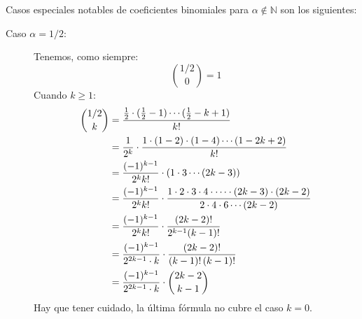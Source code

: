   Casos especiales notables de coeficientes binomiales
  para \(\alpha \notin \mathbb{N}\) son los siguientes:
  \begin{description}
  \item[\boldmath Caso \(\alpha = 1 / 2\):\unboldmath]
    Tenemos,
    como siempre:
    \begin{equation}
      \label{eq:binomial(1/2,0)}
      \binom{1/2}{0}
	= 1
    \end{equation}
    Cuando \(k \ge 1\):
    \begin{align}
      \binom{1/2}{k}
	 &= \frac{\frac{1}{2} \cdot (\frac{1}{2}-1)
	       \dotsm (\frac{1}{2} - k + 1)}{k!} \notag \\
	 &= \frac{1}{2^k}
	       \cdot \frac{1 \cdot (1 - 2) \cdot (1 - 4)
			     \dotsm (1 - 2 k + 2)}{k!} \notag \\
	 &= \frac{(-1)^{k - 1}}{2^k k!}
	       \cdot (1 \cdot 3 \dotsm (2 k - 3)) \notag \\
	 &= \frac{(-1)^{k - 1}}{2^k k!}
	       \cdot \frac{1 \cdot 2 \cdot 3 \cdot 4
			      \cdot \dotsm
			      \cdot (2 k - 3) \cdot (2 k - 2)}
			  {2 \cdot 4 \cdot 6 \dotsm (2 k - 2)}
				\notag \\
	 &= \frac{(-1)^{k - 1}}{2^k k!}
	       \cdot \frac{(2 k - 2)!}{2^{k - 1} (k - 1)!}
		  \notag \\
	 &= \frac{(-1)^{k - 1}}{2^{2 k - 1} \cdot k}
	       \cdot \frac{(2 k - 2)!}{(k - 1)! \, (k - 1)!}
		  \notag \\
	 &= \frac{(-1)^{k - 1}}{2^{2 k - 1} \cdot k}
	       \cdot \binom{2 k - 2}{k - 1}
	    \label{eq:binomial(1/2,k)}
    \end{align}
    Hay que tener cuidado,
    la última fórmula no cubre el caso \(k = 0\).


\end{description}
